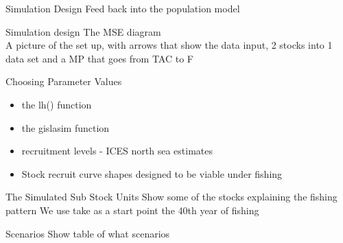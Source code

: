 \documentclass{beamer}
\begin{document}

\begin{withoutheadline}
\begin{frame}{Simulation Design}
  Feed back into the population model
\end{frame}
\end{withoutheadline}


\begin{withoutheadline}
\begin{frame}{Simulation design}
  The MSE diagram \\
  A picture of the set up, with arrows that show the data input, 2 stocks into 1 data set and a MP that goes from TAC to F
\end{frame}
\end{withoutheadline}


\begin{withoutheadline}
\begin{frame}{Choosing Parameter Values}
  \begin{itemize}
    \item the lh() function
    \item the gislasim function
    \item recruitment levels - ICES north sea estimates
    \item Stock recruit curve shapes designed to be viable under fishing
  \end{itemize}  
\end{frame}
\end{withoutheadline}


\begin{withoutheadline}
\begin{frame}{The Simulated Sub Stock Units}
  Show some of the stocks explaining the fishing pattern
  We use take as a start point the 40th year of fishing
\end{frame}
\end{withoutheadline}


\begin{withoutheadline}
\begin{frame}{Scenarios}
Show table of what scenarios
\end{frame}
\end{withoutheadline}
\end{document}
